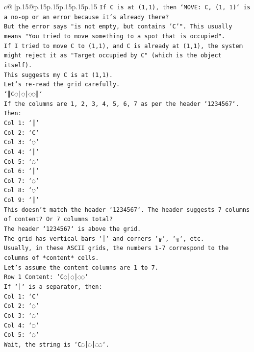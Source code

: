 \documentclass{article}
\begin{document}
{\begin{supertabular}{c@{$\;$}|p{.15\linewidth}@{}p{.15\linewidth}p{.15\linewidth}p{.15\linewidth}p{.15\linewidth}p{.15\linewidth}}
{{{\texttt{If C is at (1,1), then `MOVE: C, (1, 1)` is a no{-}op or an error because it's already there?} \\
\texttt{But the error says "is not empty, but contains 'C'". This usually means "You tried to move something to a spot that is occupied".} \\
\texttt{If I tried to move C to (1,1), and C is already at (1,1), the system might reject it as "Target occupied by C" (which is the object itself).} \\
\texttt{This suggests my C is at (1,1).} \\
\texttt{Let's re{-}read the grid carefully.} \\
\texttt{`║C◌│◌│◌◌║`} \\
\texttt{If the columns are 1, 2, 3, 4, 5, 6, 7 as per the header `1234567`.} \\
\texttt{Then:} \\
\texttt{Col 1: `║`} \\
\texttt{Col 2: `C`} \\
\texttt{Col 3: `◌`} \\
\texttt{Col 4: `│`} \\
\texttt{Col 5: `◌`} \\
\texttt{Col 6: `│`} \\
\texttt{Col 7: `◌`} \\
\texttt{Col 8: `◌`} \\
\texttt{Col 9: `║`} \\
\texttt{This doesn't match the header `1234567`. The header suggests 7 columns of content? Or 7 columns total?} \\
\texttt{The header `1234567` is above the grid.} \\
\texttt{The grid has vertical bars `│` and corners `╔`, `╗`, etc.} \\
\texttt{Usually, in these ASCII grids, the numbers 1{-}7 correspond to the columns of *content* cells.} \\
\texttt{Let's assume the content columns are 1 to 7.} \\
\texttt{Row 1 Content: `C◌│◌│◌◌`} \\
\texttt{If `│` is a separator, then:} \\
\texttt{Col 1: `C`} \\
\texttt{Col 2: `◌`} \\
\texttt{Col 3: `◌`} \\
\texttt{Col 4: `◌`} \\
\texttt{Col 5: `◌`} \\
\texttt{Wait, the string is `C◌│◌│◌◌`.} \\
}}}
\end{supertabular}}
\end{document}

